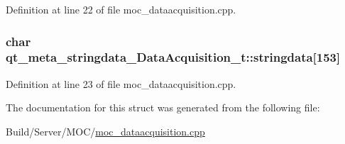 Definition at line 22 of file moc\+\_\+dataacquisition.\+cpp.

\hypertarget{structqt__meta__stringdata___data_acquisition__t_a1ba3bf5c97980ace5c219e418b22da1c}{}
\subsubsection[{stringdata}]{\setlength{\rightskip}{0pt plus 5cm}char qt\+\_\+meta\+\_\+stringdata\+\_\+\+Data\+Acquisition\+\_\+t\+::stringdata\mbox{[}153\mbox{]}}\label{structqt__meta__stringdata___data_acquisition__t_a1ba3bf5c97980ace5c219e418b22da1c}


Definition at line 23 of file moc\+\_\+dataacquisition.\+cpp.



The documentation for this struct was generated from the following file\+:\begin{DoxyCompactItemize}
\item 
Build/\+Server/\+M\+O\+C/\hyperlink{moc__dataacquisition_8cpp}{moc\+\_\+dataacquisition.\+cpp}\end{DoxyCompactItemize}
